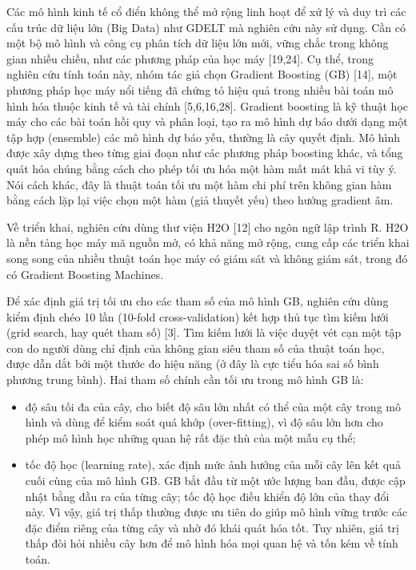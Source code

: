 Các mô hình kinh tế cổ điển không thể mở rộng linh hoạt để xử lý và duy trì các cấu trúc dữ liệu lớn (Big Data) như GDELT mà nghiên cứu này sử dụng. Cần có một bộ mô hình và công cụ phân tích dữ liệu lớn mới, vững chắc trong không gian nhiều chiều, như các phương pháp của học máy {[}19,24{]}. Cụ thể, trong nghiên cứu tính toán này, nhóm tác giả chọn Gradient Boosting (GB) {[}14{]}, một phương pháp học máy nổi tiếng đã chứng tỏ hiệu quả trong nhiều bài toán mô hình hóa thuộc kinh tế và tài chính {[}5,6,16,28{]}. Gradient boosting là kỹ thuật học máy cho các bài toán hồi quy và phân loại, tạo ra mô hình dự báo dưới dạng một tập hợp (ensemble) các mô hình dự báo yếu, thường là cây quyết định. Mô hình được xây dựng theo từng giai đoạn như các phương pháp boosting khác, và tổng quát hóa chúng bằng cách cho phép tối ưu hóa một hàm mất mát khả vi tùy ý. Nói cách khác, đây là thuật toán tối ưu một hàm chi phí trên không gian hàm bằng cách lặp lại việc chọn một hàm (giả thuyết yếu) theo hướng gradient âm.

Về triển khai, nghiên cứu dùng thư viện H2O {[}12{]} cho ngôn ngữ lập trình R. H2O là nền tảng học máy mã nguồn mở, có khả năng mở rộng, cung cấp các triển khai song song của nhiều thuật toán học máy có giám sát và không giám sát, trong đó có Gradient Boosting Machines.

Để xác định giá trị tối ưu cho các tham số của mô hình GB, nghiên cứu dùng kiểm định chéo 10 lần (10-fold cross-validation) kết hợp thủ tục tìm kiếm lưới (grid search, hay quét tham số) {[}3{]}. Tìm kiếm lưới là việc duyệt vét cạn một tập con do người dùng chỉ định của không gian siêu tham số của thuật toán học, được dẫn dắt bởi một thước đo hiệu năng (ở đây là cực tiểu hóa sai số bình phương trung bình). Hai tham số chính cần tối ưu trong mô hình GB là:

\begin{itemize}
\item
  độ sâu tối đa của cây, cho biết độ sâu lớn nhất có thể của một cây trong mô hình và dùng để kiểm soát quá khớp (over-fitting), vì độ sâu lớn hơn cho phép mô hình học những quan hệ rất đặc thù của một mẫu cụ thể;
\item
  tốc độ học (learning rate), xác định mức ảnh hưởng của mỗi cây lên kết quả cuối cùng của mô hình GB. GB bắt đầu từ một ước lượng ban đầu, được cập nhật bằng đầu ra của từng cây; tốc độ học điều khiển độ lớn của thay đổi này. Vì vậy, giá trị thấp thường được ưu tiên do giúp mô hình vững trước các đặc điểm riêng của từng cây và nhờ đó khái quát hóa tốt. Tuy nhiên, giá trị thấp đòi hỏi nhiều cây hơn để mô hình hóa mọi quan hệ và tốn kém về tính toán.
\end{itemize}

